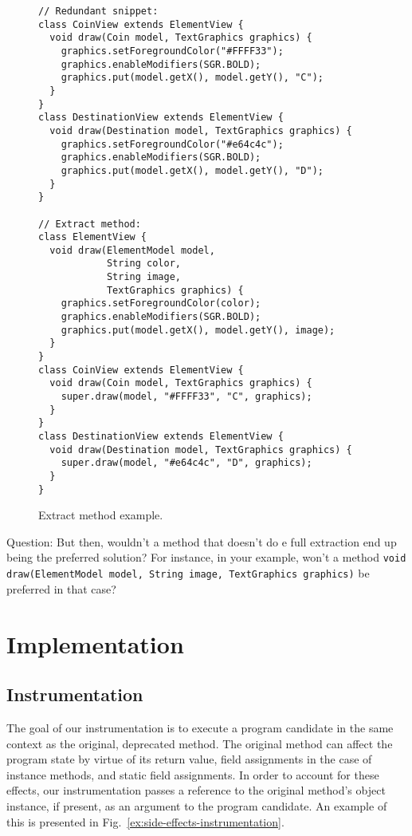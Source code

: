 \documentclass[runningheads,a4paper]{llncs}
\begin{document}
\begin{figure}
\begin{lstlisting}[mathescape=true,showstringspaces=false]
// Redundant snippet:
class CoinView extends ElementView {
  void draw(Coin model, TextGraphics graphics) {
    graphics.setForegroundColor("#FFFF33");
    graphics.enableModifiers(SGR.BOLD);
    graphics.put(model.getX(), model.getY(), "C");
  }
}
class DestinationView extends ElementView {
  void draw(Destination model, TextGraphics graphics) {
    graphics.setForegroundColor("#e64c4c");
    graphics.enableModifiers(SGR.BOLD);
    graphics.put(model.getX(), model.getY(), "D");
  }
}

// Extract method:
class ElementView {
  void draw(ElementModel model,
            String color,
            String image,
            TextGraphics graphics) {
    graphics.setForegroundColor(color);
    graphics.enableModifiers(SGR.BOLD);
    graphics.put(model.getX(), model.getY(), image);
  }
}
class CoinView extends ElementView {
  void draw(Coin model, TextGraphics graphics) {
    super.draw(model, "#FFFF33", "C", graphics);
  }
}
class DestinationView extends ElementView {
  void draw(Destination model, TextGraphics graphics) {
    super.draw(model, "#e64c4c", "D", graphics);
  }
}
\end{lstlisting}
\caption{Extract method example.}
\label{ex:extract-method}
\end{figure}


Question: But then, wouldn't a method that doesn't do e full extraction
end up being the preferred solution? For instance, in your example,
won't a method
\texttt{void draw(ElementModel model, String image,
TextGraphics graphics)} be preferred in that case?


\section{Implementation}

\subsection{Instrumentation}

The goal of our instrumentation is to execute a program candidate in
the same context as the original, deprecated method. The original
method can affect the program state by virtue of its return value,
field assignments in the case of instance methods, and static field
assignments. In order to account for these effects, our
instrumentation passes a reference to the original method's object
instance, if present, as an argument to the program candidate.
An example of this is presented in
Fig.~\ref{ex:side-effects-instrumentation}.
\end{document}
